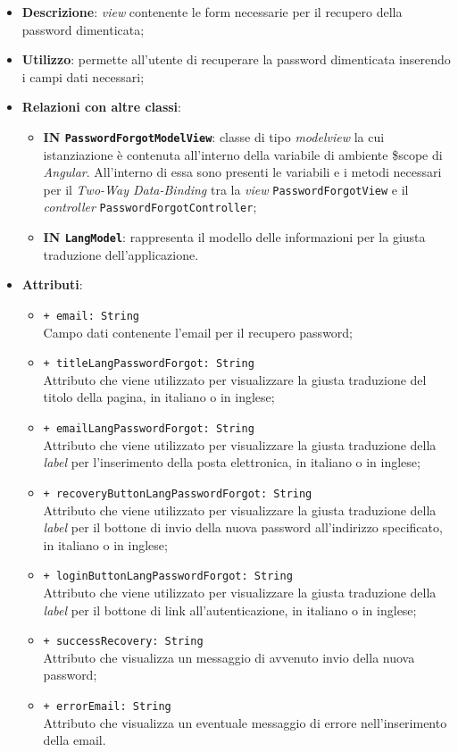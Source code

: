 \begin{itemize}
	\item \textbf{Descrizione}: \textit{view} contenente le form necessarie per il recupero della password dimenticata;
	\item \textbf{Utilizzo}: permette all'utente di recuperare la password dimenticata inserendo i campi dati necessari;
	\item \textbf{Relazioni con altre classi}:
	\begin{itemize}
			\item \textbf{IN \texttt{PasswordForgotModelView}}: classe di tipo \textit{modelview} la cui istanziazione è contenuta all'interno della variabile di ambiente \$scope di \textit{Angular}. All'interno di essa sono presenti le variabili e i metodi necessari per il \textit{Two-Way Data-Binding} tra la \textit{view} \texttt{PasswordForgotView} e il \textit{controller} \texttt{PasswordForgotController};
			\item \textbf{IN \texttt{LangModel}}: rappresenta il modello delle informazioni per la giusta traduzione dell'applicazione.
	\end{itemize}
	\item \textbf{Attributi}:
	\begin{itemize}
		\item \texttt{+ email: String} \\ Campo dati contenente l'email per il recupero password;
		\item \texttt{+ titleLangPasswordForgot: String} \\ Attributo che viene utilizzato per visualizzare la giusta traduzione del titolo della pagina, in italiano o in inglese;
		\item \texttt{+ emailLangPasswordForgot: String} \\ Attributo che viene utilizzato per visualizzare la giusta traduzione della \textit{label} per l'inserimento della posta elettronica, in italiano o in inglese;
		\item \texttt{+ recoveryButtonLangPasswordForgot: String} \\ Attributo che viene utilizzato per visualizzare la giusta traduzione della \textit{label} per il bottone di invio della nuova password all'indirizzo specificato, in italiano o in inglese;
		\item \texttt{+ loginButtonLangPasswordForgot: String} \\ Attributo che viene utilizzato per visualizzare la giusta traduzione della \textit{label} per il bottone di link all'autenticazione, in italiano o in inglese;
		\item \texttt{+ successRecovery: String} \\ Attributo che visualizza un messaggio di avvenuto invio della nuova password;
		\item \texttt{+ errorEmail: String} \\ Attributo che visualizza un eventuale messaggio di errore nell'inserimento della email.
	\end{itemize}
\end{itemize}